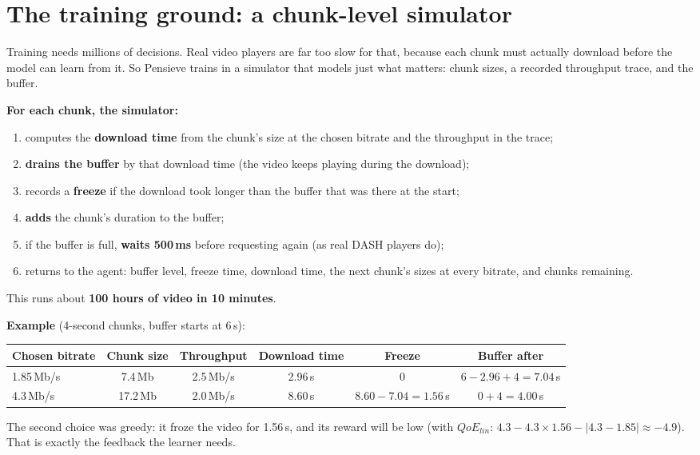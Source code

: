 \section{The training ground: a chunk-level simulator}

Training needs millions of decisions. Real video players are far too slow for that, because each chunk must actually download before the model can learn from
it. So Pensieve trains in a simulator that models just what matters: chunk sizes, a recorded throughput trace, and the buffer.

\textbf{For each chunk, the simulator:}
\begin{enumerate}
  \item computes the \textbf{download time} from the chunk's size at the chosen bitrate and the throughput in the trace;
  \item \textbf{drains the buffer} by that download time (the video keeps playing during the download);
  \item records a \textbf{freeze} if the download took longer than the buffer that was there at the start;
  \item \textbf{adds} the chunk's duration to the buffer;
  \item if the buffer is full, \textbf{waits 500\,ms} before requesting again (as real DASH players do);
  \item returns to the agent: buffer level, freeze time, download time, the next chunk's sizes at every bitrate, and chunks remaining.
\end{enumerate}
This runs about \textbf{100 hours of video in 10 minutes}.

\textbf{Example} (4-second chunks, buffer starts at 6\,s):
\begin{center}
\begin{tabular}{@{}lccccc@{}}
\toprule
Chosen bitrate & Chunk size & Throughput & Download time & Freeze & Buffer after\\
\midrule
1.85\,Mb/s & 7.4\,Mb & 2.5\,Mb/s & 2.96\,s & 0 & $6 - 2.96 + 4 = 7.04$\,s\\
4.3\,Mb/s & 17.2\,Mb & 2.0\,Mb/s & 8.60\,s & $8.60 - 7.04 = 1.56$\,s & $0 + 4 = 4.00$\,s\\
\bottomrule
\end{tabular}
\end{center}
The second choice was greedy: it froze the video for 1.56\,s, and its reward will be low (with $QoE_{lin}$: $4.3 - 4.3\times1.56 - |4.3-1.85| \approx -4.9$).
That is exactly the feedback the learner needs.

